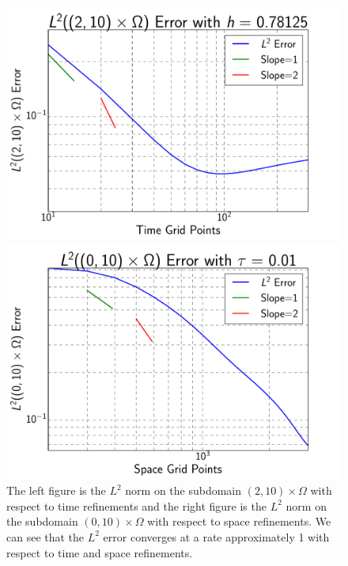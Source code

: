 \documentclass{siamart1116}
\begin{document}
\begin{figure}[h!] %
\begin{center}
\begin{minipage}{.5\textwidth}
\includegraphics[width=\linewidth]{L2_timeErr2}
\end{minipage}%
\begin{minipage}{.5\textwidth}
\includegraphics[width=\linewidth]{L2_spaceErr1}
\end{minipage}%
\end{center}
\label{errorplot}
\caption{{\footnotesize The left figure is the $L^2$ norm on the subdomain $(2,10)\times\Omega$ with respect to time refinements and the right figure is the $L^2$ norm on the subdomain $(0,10)\times\Omega$ with respect to space refinements. We can see that the $L^2$ error converges at a rate approximately 1 with respect to time and space refinements.}}
\end{figure}
\end{document}
